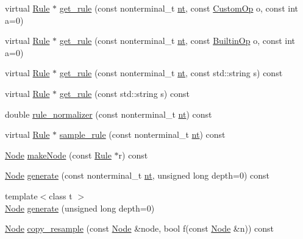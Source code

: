 \begin{DoxyCompactItemize}
\item 
virtual \hyperlink{class_rule}{Rule} $\ast$ \hyperlink{class_grammar_aa642e370571830772b8d3be70cb5a5c7}{get\+\_\+rule} (const nonterminal\+\_\+t \hyperlink{class_grammar_aa5c9afa0e7e1aa989b54402b02a677a3}{nt}, const \hyperlink{_instruction_8h_a3a20ca4a8f0ab220518b030cc23ffee4}{Custom\+Op} o, const int a=0)
\item 
virtual \hyperlink{class_rule}{Rule} $\ast$ \hyperlink{class_grammar_ab82ed6614e4fcced4d0e7c742e1c5e4b}{get\+\_\+rule} (const nonterminal\+\_\+t \hyperlink{class_grammar_aa5c9afa0e7e1aa989b54402b02a677a3}{nt}, const \hyperlink{_instruction_8h_af2fb7c87c5854c5733d7bb0506b06de7}{Builtin\+Op} o, const int a=0)
\item 
virtual \hyperlink{class_rule}{Rule} $\ast$ \hyperlink{class_grammar_ae0198e1a6c052fad5cba950e0ad60d67}{get\+\_\+rule} (const nonterminal\+\_\+t \hyperlink{class_grammar_aa5c9afa0e7e1aa989b54402b02a677a3}{nt}, const std\+::string s) const
\item 
virtual \hyperlink{class_rule}{Rule} $\ast$ \hyperlink{class_grammar_adecdec03b3211bd3b6800511c7ed5dd9}{get\+\_\+rule} (const std\+::string s) const
\item 
double \hyperlink{class_grammar_a2182b3ded5171ba3e84be952176798e9}{rule\+\_\+normalizer} (const nonterminal\+\_\+t \hyperlink{class_grammar_aa5c9afa0e7e1aa989b54402b02a677a3}{nt}) const
\item 
virtual \hyperlink{class_rule}{Rule} $\ast$ \hyperlink{class_grammar_a50c30e020e54743d5ede0ca9469fdb91}{sample\+\_\+rule} (const nonterminal\+\_\+t \hyperlink{class_grammar_aa5c9afa0e7e1aa989b54402b02a677a3}{nt}) const
\item 
\hyperlink{class_node}{Node} \hyperlink{class_grammar_a5d60795be5b288d74a87f2cc52008f71}{make\+Node} (const \hyperlink{class_rule}{Rule} $\ast$r) const
\item 
\hyperlink{class_node}{Node} \hyperlink{class_grammar_a6a08c44dbbba7406d3638bdc549fddad}{generate} (const nonterminal\+\_\+t \hyperlink{class_grammar_aa5c9afa0e7e1aa989b54402b02a677a3}{nt}, unsigned long depth=0) const
\item 
{\footnotesize template$<$class t $>$ }\\\hyperlink{class_node}{Node} \hyperlink{class_grammar_aee4cda199ab92f79b55e73f6cbd90c8b}{generate} (unsigned long depth=0)
\item 
\hyperlink{class_node}{Node} \hyperlink{class_grammar_ad6333cce88a2fe7ce56a897a6a930c28}{copy\+\_\+resample} (const \hyperlink{class_node}{Node} \&node, bool f(const \hyperlink{class_node}{Node} \&n)) const

\end{DoxyCompactItemize}
